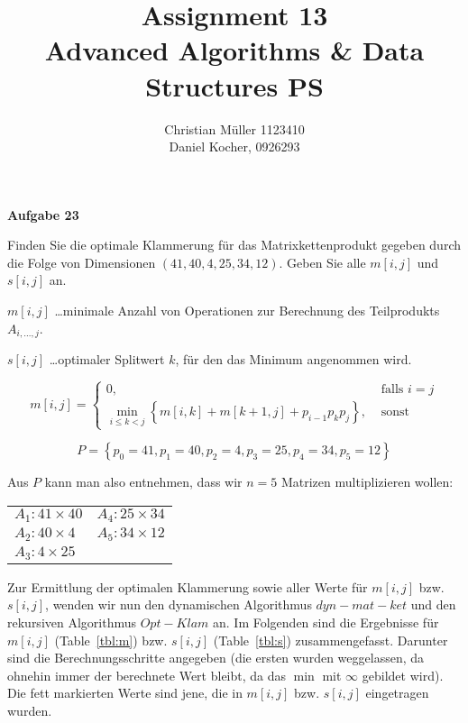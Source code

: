 \documentclass{article}
\begin{document}
\title{Assignment 13 \\ Advanced Algorithms \& Data Structures PS}%
\author{Christian Müller 1123410 \\ Daniel Kocher, 0926293}%
\maketitle

{\bfseries Aufgabe 23}%

Finden Sie die optimale Klammerung f{\"u}r das Matrixkettenprodukt gegeben durch
die Folge von Dimensionen $(41, 40, 4, 25, 34, 12)$. Geben Sie alle $m[i, j]$
und $s[i, j]$ an.

$m[i, j]$ \ldots minimale Anzahl von Operationen zur Berechnung des Teilprodukts
$A_{i, \ldots, j}$.

$s[i, j]$ \ldots optimaler Splitwert $k$, f{\"u}r den das  Minimum angenommen
wird.

\begin{equation}
m[i, j] = \begin{cases}
  0, & \text{ falls } i = j \\
  \min\limits_{i \leq k < j} \left\{ m[i, k] + m[k + 1, j] + p_{i - 1}p_kp_j \right\}, & \text{ sonst}
\end{cases}
\end{equation}

\begin{equation}
P = \left\{ p_0 = 41, p_1 = 40, p_2 = 4, p_3 = 25, p_4 = 34, p_5 = 12 \right\}
\end{equation}

Aus $P$ kann man also entnehmen, dass wir $n = 5$ Matrizen multiplizieren wollen:
\begin{center}
\begin{tabular}{ll}
$A_1: 41 \times 40$ & $A_4: 25 \times 34$ \tabularnewline
$A_2: 40 \times 4$ & $A_5: 34 \times 12$ \tabularnewline
$A_3: 4 \times 25$ & \tabularnewline
\end{tabular}
\end{center}

Zur Ermittlung der optimalen Klammerung sowie aller Werte f{\"u}r $m[i, j]$ bzw.
$s[i, j]$, wenden wir nun den dynamischen Algorithmus $dyn-mat-ket$ und den
rekursiven Algorithmus $Opt-Klam$ an. Im Folgenden sind die Ergebnisse f{\"u}r
$m[i, j]$ (Table~\ref{tbl:m}) bzw. $s[i, j]$ (Table~\ref{tbl:s}) zusammengefasst.
Darunter sind die Berechnungsschritte angegeben (die ersten wurden weggelassen,
da ohnehin immer der berechnete Wert bleibt, da das $\min$ mit $\infty$ gebildet
wird). Die fett markierten Werte sind jene, die in $m[i, j]$ bzw. $s[i, j]$
eingetragen wurden.
\end{document}
